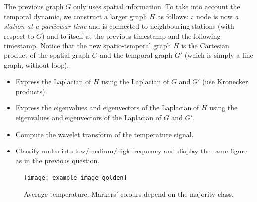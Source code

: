 \documentclass[11pt]{article}
\begin{document}
\newpage
\begin{exercise}
The previous graph $G$ only uses spatial information.
To take into account the temporal dynamic, we construct a larger graph $H$ as follows: a node is now \textit{a station at a particular time} and is connected to neighbouring stations (with respect to $G$) and to itself at the previous timestamp and the following timestamp.
Notice that the new spatio-temporal graph $H$ is the Cartesian product of the spatial graph $G$ and the temporal graph $G'$ (which is simply a line graph, without loop).

\begin{itemize}
    \item Express the Laplacian of $H$ using the Laplacian of $G$ and $G'$ (use Kronecker products).
    \item Express the eigenvalues and eigenvectors of the Laplacian of $H$ using the eigenvalues and eigenvectors of the Laplacian of $G$ and $G'$.
    \item Compute the wavelet transform of the temperature signal.
    \item Classify nodes into low/medium/high frequency and display the same figure as in the previous question.
\end{itemize}
\end{exercise}

\begin{solution}
\begin{figure}
    \centering
    \begin{minipage}[t]{0.8\textwidth}
    \centerline{\texttt{[image: example-image-golden]}}
    \end{minipage}
    \caption{Average temperature. Markers' colours depend on the majority class.}
\end{figure}
\end{solution}
\end{document}
